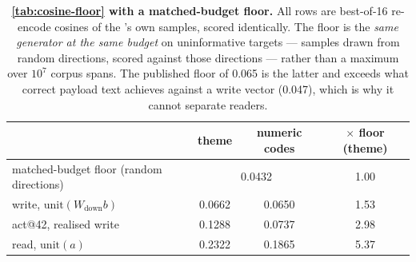 \begin{table}[t]
\centering
\caption{\textbf{\cref{tab:cosine-floor} with a matched-budget floor.} All rows are best-of-16
re-encode cosines of the \method{}'s own samples, scored identically. The floor is the \emph{same
generator at the same budget} on uninformative targets --- \method{} samples drawn from random
directions, scored against those directions --- rather than a maximum over $10^7$ corpus spans. The
published floor of 0.065 is the latter and exceeds what correct payload text achieves against a
write vector (0.047), which is why it cannot separate readers.}
\label{tab:cosine-floor-matched}
\begin{tabular}{@{}lccc@{}}
\toprule
 & theme & numeric codes & $\times$ floor (theme) \\
\midrule
matched-budget floor (random directions) & \multicolumn{2}{c}{0.0432} & 1.00 \\
\midrule
write, $\mathrm{unit}(W_{\mathrm{down}}b)$ & 0.0662 & 0.0650 & 1.53 \\
act@42, realised write                     & 0.1288 & 0.0737 & 2.98 \\
read, $\mathrm{unit}(a)$                   & 0.2322 & 0.1865 & 5.37 \\
\bottomrule
\end{tabular}
\end{table}
